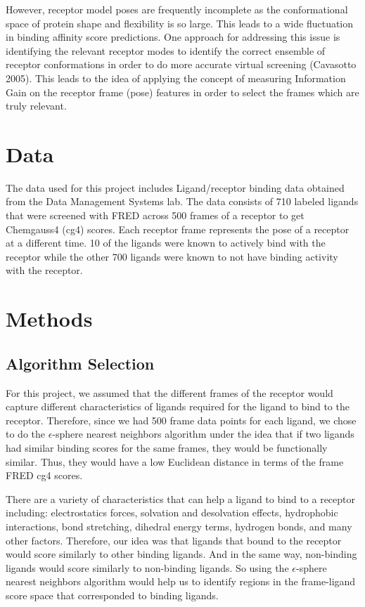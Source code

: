 \documentclass[11pt,letterpaper]{article}
\begin{document}
However, receptor model poses are frequently incomplete as the conformational space of protein shape and flexibility is so large.  This leads to a wide fluctuation in binding affinity score predictions.  One approach for addressing this issue is identifying the relevant receptor modes to identify the correct ensemble of receptor conformations in order to do more accurate virtual screening (Cavasotto 2005).  This leads to the idea of applying the concept of measuring Information Gain on the receptor frame (pose) features in order to select the frames which are truly relevant.

\section{Data}
The data used for this project includes Ligand/receptor binding data obtained from the Data Management Systems lab. The data consists of 710 labeled ligands that were screened with FRED across 500 frames of a receptor to get Chemgauss4 (cg4) scores. Each receptor frame represents the pose of a receptor at a different time.  10 of the ligands were known to actively bind with the receptor while the other 700 ligands were known to not have binding activity with the receptor.

\section{Methods}
\subsection{Algorithm Selection}
For this project, we assumed that the different frames of the receptor would capture different characteristics of ligands required for the ligand to bind to the receptor.  Therefore, since we had 500 frame data points for each ligand, we chose to do the $\epsilon$-sphere nearest neighbors algorithm under the idea that if two ligands had similar binding scores for the same frames, they would be functionally similar.  Thus, they would have a low Euclidean distance in terms of the frame FRED cg4 scores.

There are a variety of characteristics that can help a ligand to bind to a receptor including: electrostatics forces, solvation and desolvation effects, hydrophobic interactions, bond stretching, dihedral energy terms, hydrogen bonds, and many other factors.  Therefore, our idea was that ligands that bound to the receptor would score similarly to other binding ligands.  And in the same way, non-binding ligands would score similarly to non-binding ligands.  So using the $\epsilon$-sphere nearest neighbors algorithm would help us to identify regions in the frame-ligand score space that corresponded to binding ligands.
\end{document}

